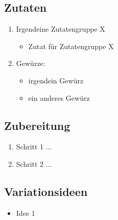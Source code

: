     \subsection*{Zutaten}
      \begin{enumerate}
        \item Irgendeine Zutatengruppe X
        \begin{itemize}
          \item Zutat für Zutatengruppe X
        \end{itemize}
        \item Gewürze:
        \begin{itemize}
          \item irgendein Gewürz
          \item ein anderes Gewürz
        \end{itemize}
      \end{enumerate}

    \subsection*{Zubereitung}
      \begin{enumerate}
        \item Schritt 1 ...
        \item Schritt 2 ...
      \end{enumerate}

    \subsection*{Variationsideen}
      \begin{itemize}
        \item Idee 1
      \end{itemize}
